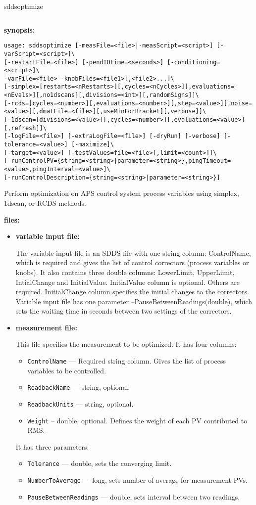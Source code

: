 \begin{sddsprog}{sddsoptimize}
\begin{verbatim}
\end{verbatim}

\item \textbf{synopsis:}
\begin{verbatim}
usage: sddsoptimize [-measFile=<file>|-measScript=<script>] [-varScript=<script>]\
[-restartFile=<file>] [-pendIOtime=<seconds>] [-conditioning=<script>]\
-varFile=<file> -knobFiles=<file1>[,<file2>...]\
[-simplex=[restarts=<nRestarts>][,cycles=<nCycles>][,evaluations=<nEvals>][,no1dscans][,divisions=<int>][,randomSigns]]\
[-rcds=[cycles=<number>][,evaluations=<number>][,step=<value>][,noise=<value>][,dmatFile=<file>][,useMinForBracket][,verbose]]\
[-1dscan=[divisions=<value>][,cycles=<number>][,evaluations=<value>][,refresh]]\
[-logFile=<file>] [-extraLogFile=<file>] [-dryRun] [-verbose] [-tolerance=<value>] [-maximize]\
[-target=<value>] [-testValues=file=<file>[,limit=<count>]]\
[-runControlPV={string=<string>|parameter=<string>},pingTimeout=<value>,pingInterval=<value>]\
[-runControlDescription={string=<string>|parameter=<string>}]
\end{verbatim}
Perform optimization on APS control system process variables using simplex, 1dscan, or RCDS methods.
\item \textbf{files:}
\begin{itemize}
  \item \textbf{variable input file:} \par
The variable input file is an SDDS file with one string column: ControlName, which is required
and gives the list of control correctors (process variables or knobs). It also contains three
double columns: LowerLimit, UpperLimit, IntialChange and InitialValue. InitialValue column
is optional. Others are required. InitialChange column specifies the initial changes to the correctors.
Variable input file has one parameter --PauseBetweenReadings(double), which sets the waiting time in
seconds between two settings of the correctors.
  \item \textbf{measurement file:} \par This file specifies the measurement to be optimized.
It has four columns:
  \begin{itemize}
    \item {\tt ControlName} --- Required string column. Gives the list of process variables
                 to be controlled.
    \item {\tt ReadbackName} --- string, optional.
    \item {\tt ReadbackUnits} --- string, optional.
    \item {\tt Weight} -- double, optional. Defines the weight of each PV contributed to RMS.
  \end{itemize}
It has three parameters:
  \begin{itemize}
    \item {\tt Tolerance} --- double, sets the converging limit.
    \item {\tt NumberToAverage} --- long, sets number of average for measurement PVs.
    \item {\tt PauseBetweenReadings} --- double, sets interval between two readings.


\end{itemize}
\end{itemize}
\end{sddsprog}
